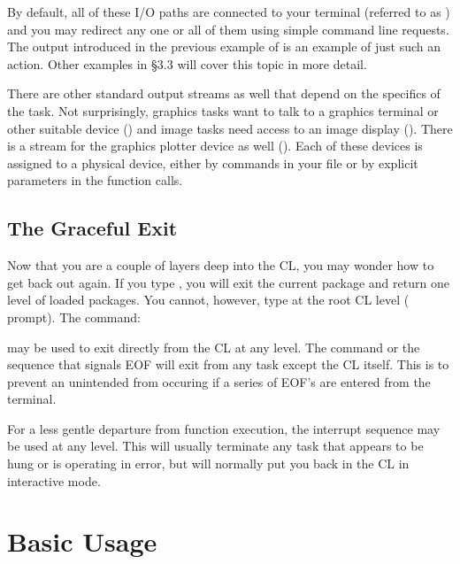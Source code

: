 \noindent
By default, all of these I/O paths are connected to your terminal 
(referred to as ) and you may redirect any one or all 
of them using simple command line requests.  The output 
 introduced in the previous example of 
 is an example of just such an action.  Other 
examples in \S 3.3 will cover this topic in more detail.  

There are other standard output streams as well that depend on the
specifics of the task.  Not surprisingly,  graphics tasks
want to talk to a graphics terminal or other suitable device
() and image tasks need access to an image display
(). There is a stream for the graphics plotter device as well
(). Each of these  devices is assigned
to a physical device, either by commands in your  file
or by explicit parameters in the function calls.

\subsection{The Graceful Exit}

\ppind
Now that you are a couple of layers deep into the CL, you may wonder 
how to get back out again. If you type , you will exit the current
package and return one level of loaded packages.  You cannot, however, type
 at the root CL level ( prompt).
The command:

\begin{quotation}\noindent
{} 
\end{quotation}

\noindent
may be used to exit directly from the CL at any level.  
The  command or the  sequence that signals
EOF will exit from any task except the CL itself.  This is to
prevent an unintended  from occuring if a series
of EOF's are entered from the terminal.

For a less gentle departure from function execution, the interrupt
sequence  may be used at any level.  
This will usually terminate any task that appears to
be hung or is operating in error, but will normally put you
back in the CL in interactive mode.

\newpage
\section{Basic Usage}

